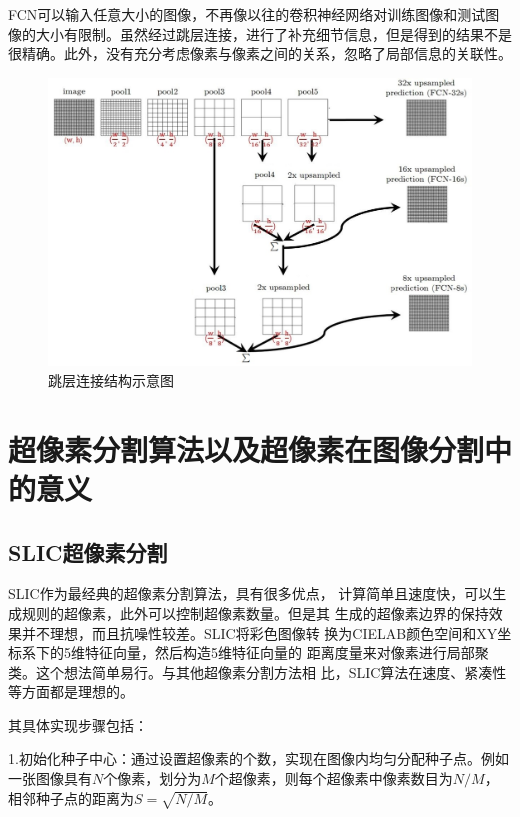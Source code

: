 FCN可以输入任意大小的图像，不再像以往的卷积神经网络对训练图像和测试图像的大小有限制。虽然经过跳层连接，进行了补充细节信息，但是得到的结果不是很精确。此外，没有充分考虑像素与像素之间的关系，忽略了局部信息的关联性。

\begin{figure}[h]
\begin{center}
\includegraphics[width=1\textwidth]{figures/FCN2.jpg}
\end{center}
\vspace{-5mm}
\caption{跳层连接结构示意图}
\label{fig2.7}
\end{figure}

\section{超像素分割算法以及超像素在图像分割中的意义}

\subsection{SLIC超像素分割}

SLIC作为最经典的超像素分割算法，具有很多优点，
计算简单且速度快，可以生成规则的超像素，此外可以控制超像素数量。但是其
生成的超像素边界的保持效果并不理想，而且抗噪性较差。SLIC将彩色图像转
换为CIELAB颜色空间和XY坐标系下的5维特征向量，然后构造5维特征向量的
距离度量来对像素进行局部聚类。这个想法简单易行。与其他超像素分割方法相
比，SLIC算法在速度、紧凑性等方面都是理想的。

其具体实现步骤包括：

1.初始化种子中心：通过设置超像素的个数，实现在图像内均匀分配种子点。例如一张图像具有$N$个像素，划分为$M$个超像素，则每个超像素中像素数目为$N/M$，相邻种子点的距离为$S=\sqrt{N/M}$。

